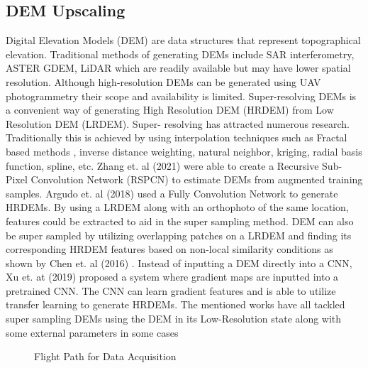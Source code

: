\documentclass[conference]{IEEEtran}
\begin{document}
\subsection{DEM Upscaling}
Digital Elevation Models (DEM) are data structures that
represent topographical elevation. Traditional methods of
generating DEMs include SAR interferometry, ASTER
GDEM, LiDAR which are readily available but may have
lower spatial resolution. Although high-resolution DEMs
can be generated using UAV photogrammetry their scope
and availability is limited. Super-resolving DEMs is a
convenient way of generating High Resolution DEM
(HRDEM) from Low Resolution DEM (LRDEM). Super-
resolving has attracted numerous research. Traditionally this
is achieved by using interpolation techniques such as Fractal
based methods \cite{322050}, inverse distance weighting, natural
neighbor, kriging, radial basis function, spline, etc. Zhang
et. al (2021) \cite{ijgi10080501} were able to create a Recursive Sub-Pixel
Convolution Network (RSPCN) to estimate DEMs from
augmented training samples. Argudo et. al (2018) \cite{argudo2018} used a Fully Convolution Network to generate HRDEMs. By using
a LRDEM along with an orthophoto of the same location,
features could be extracted to aid in the super sampling
method. DEM can also be super sampled by utilizing
overlapping patches on a LRDEM and finding its
corresponding HRDEM features based on non-local
similarity conditions as shown by Chen et. al (2016) \cite{chen2016}.
Instead of inputting a DEM directly into a CNN, Xu et. at
(2019) \cite{XU201980} proposed a system where gradient maps are
inputted into a pretrained CNN. The CNN can learn gradient
features and is able to utilize transfer learning to generate
HRDEMs. The mentioned works have all tackled super
sampling DEMs using the DEM in its Low-Resolution state
along with some external parameters in some cases


\begin{figure}[htbp]
    \caption{Flight Path for Data Acquisition}
    \label{Flight Path for Data Acquisition}
\end{figure}
\end{document}
